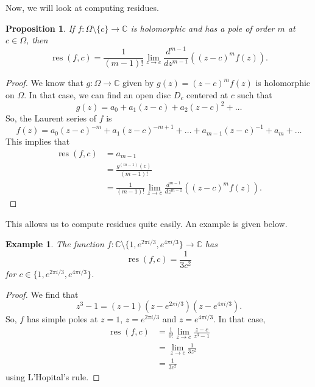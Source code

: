 \documentclass[a4paper, openany]{memoir}
\theoremstyle{definition}
\theoremstyle{plain}
\newtheorem{proposition}[definition]{Proposition}
\newtheorem{example}[definition]{Example}
\begin{document}
Now, we will look at computing residues.
\begin{proposition}
    If $f: \Omega \setminus \{c\} \to \mathbb{C}$ is holomorphic and has a pole of order $m$ at $c \in \Omega$, then
    \[\operatorname{res}(f, c) = \frac{1}{(m-1)!} \lim_{z \to c} \frac{d^{m-1}}{dz^{m-1}} \left((z - c)^m f(z)\right).\]
\end{proposition}
\begin{proof}
    We know that $g: \Omega \to \mathbb{C}$ given by $g(z) = (z - c)^m f(z)$ is holomorphic on $\Omega$. In that case, we can find an open disc $D_c$ centered at $c$ such that
    \[g(z) = a_0 + a_1 (z - c) + a_2 (z - c)^2 + \dots\]
    So, the Laurent series of $f$ is
    \[f(z) = a_0 (z - c)^{-m} + a_1 (z - c)^{-m + 1} + \dots + a_{m-1} (z - c)^{-1} + a_m + \dots\]
    This implies that
    \begin{align*}
        \operatorname{res}(f, c) &= a_{m-1} \\
        &= \frac{g^{(m-1)}(c)}{(m-1)!} \\ %
        &= \frac{1}{(m-1)!} \lim_{z \to c} \frac{d^{m-1}}{dz^{m-1}} \left((z - c)^m f(z) \right). %
    \end{align*}
\end{proof}
\noindent This allows us to compute residues quite easily. An example is given below.
\begin{example}
    The function $f: \mathbb{C} \setminus \{1, e^{2\pi i/3}, e^{4\pi i/3}\} \to \mathbb{C}$ has 
    \[\operatorname{res}(f, c) = \frac{1}{3c^2}\]
    for $c \in \{1, e^{2\pi i/3}, e^{4\pi i/3}\}$.
\end{example}
\begin{proof}
    We find that
    \[z^3 - 1 = (z - 1) (z - e^{2\pi i/3}) (z - e^{4\pi i/3}).\]
    So, $f$ has simple poles at $z = 1$, $z = e^{2\pi i/3}$ and $z = e^{4\pi i/3}$. In that case,
    \begin{align*}
        \operatorname{res}(f, c) &= \frac{1}{0!} \lim_{z \to c} \frac{z - c}{z^3 - 1} \\
        &= \lim_{z \to c} \frac{1}{3z^2} \\
        &= \frac{1}{3c^2}
    \end{align*}
    using L'Hopital's rule.
\end{proof}


\end{document}

